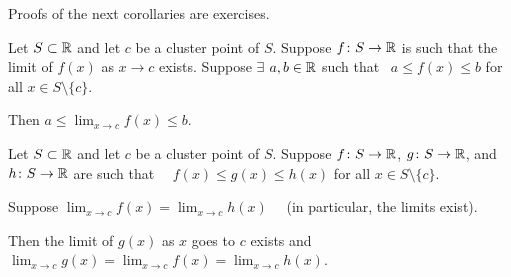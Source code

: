 \documentclass[10pt,aspectratio=169]{beamer}
\begin{document}
\begin{frame}

Proofs of the next corollaries are exercises.

\pause
\begin{corollary}
Let $S \subset {\mathbb{R}}$ and let $c$ be a cluster point of $S$.  Suppose $f \colon S \to
{\mathbb{R}}$ is such that the limit of $f(x)$ as $x \to c$ exists.
Suppose $\exists$ $a,b \in {\mathbb{R}}$ such that
~$a \leq f(x) \leq b$ for all $x \in S \setminus \{ c \}$.

\pause
\medskip

Then \quad $\displaystyle a \leq \lim_{x\to c} f(x) \leq b$.
\end{corollary}

\pause
\begin{corollary}
Let $S \subset {\mathbb{R}}$ and let $c$ be a cluster point of $S$.
Suppose $f \colon S \to {\mathbb{R}}$,
$g \colon S \to {\mathbb{R}}$, and $h \colon S \to {\mathbb{R}}$ are such that
~~$f(x) \leq g(x) \leq h(x)$ for all $x \in S \setminus \{ c \}$.

\pause
\medskip

Suppose $\displaystyle \lim_{x\to c} f(x) = \lim_{x\to c} h(x)$
~~(in particular, the limits exist).

\pause
\medskip

Then the limit of $g(x)$ as $x$ goes to $c$ exists and
~~$\displaystyle \lim_{x\to c} g(x) =
\lim_{x\to c} f(x) = \lim_{x\to c} h(x)$.
\end{corollary}

\end{frame}
\end{document}
